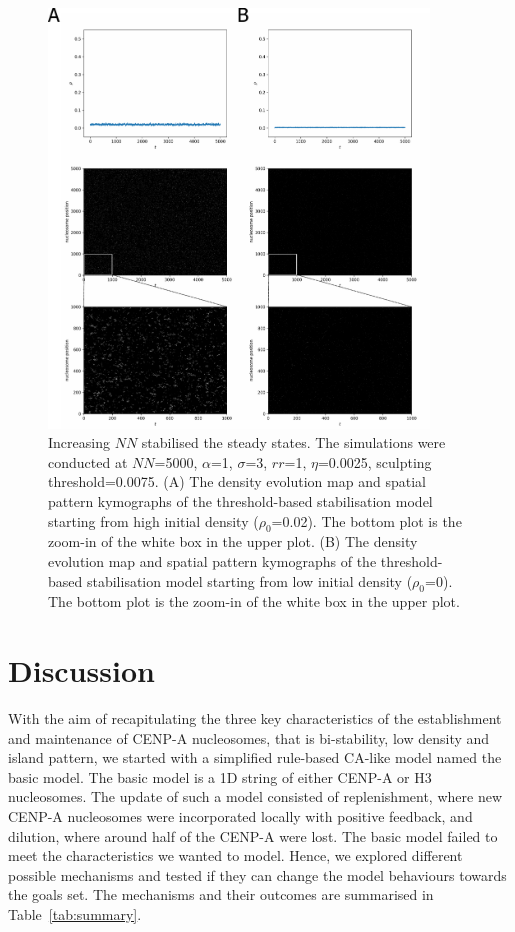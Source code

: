\begin{figure}[htbp]
  \centering
  \includegraphics[width=0.9\textwidth]{chapter2/figures/doubleLongArray.pdf}
  \caption[Increasing $NN$ stabilised the steady states]{Increasing $NN$ stabilised the steady states. The simulations were conducted at $NN$=5000, $\alpha$=1, $\sigma$=3, $rr$=1, $\eta$=0.0025, sculpting threshold=0.0075. (A) The density evolution map and spatial pattern kymographs of the threshold-based stabilisation model starting from high initial density ($\rho_{0}$=0.02). The bottom plot is the zoom-in of the white box in the upper plot. (B) The density evolution map and spatial pattern kymographs of the threshold-based stabilisation model starting from low initial density ($\rho_{0}$=0). The bottom plot is the zoom-in of the white box in the upper plot.}
  \label{fig:doubleLongArray}
\end{figure}

\section{Discussion}

With the aim of recapitulating the three key characteristics of the establishment and maintenance of CENP-A nucleosomes, that is bi-stability, low density and island pattern, we started with a simplified rule-based CA-like model named the basic model. The basic model is a 1D string of either CENP-A or H3 nucleosomes. The update of such a model consisted of replenishment, where new CENP-A nucleosomes were incorporated locally with positive feedback, and dilution, where around half of the CENP-A were lost. The basic model failed to meet the characteristics we wanted to model. Hence, we explored different possible mechanisms and tested if they can change the model behaviours towards the goals set. The mechanisms and their outcomes are summarised in Table~\ref{tab:summary}. 

